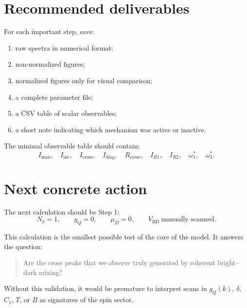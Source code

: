 \documentclass[11pt]{article}
\begin{document}
\section{Recommended deliverables}

For each important step, save:
\begin{enumerate}
    \item raw spectra in numerical format;
    \item non-normalized figures;
    \item normalized figures only for visual comparison;
    \item a complete parameter file;
    \item a CSV table of scalar observables;
    \item a short note indicating which mechanism was active or inactive.
\end{enumerate}

The minimal observable table should contain:
\begin{equation}
I_{\max},\quad
I_{\mathrm{int}},\quad
I_{\mathrm{cross}},\quad
I_{\mathrm{diag}},\quad
R_{\mathrm{cross}},\quad
I_{R1},\quad
I_{R2},\quad
\omega_1^\ast,\quad
\omega_3^\ast.
\end{equation}

\section{Next concrete action}

The next calculation should be Step 1:
\begin{equation}
N_k=1,\qquad
g_Q=0,\qquad
\mu_D=0,\qquad
V_{\mathrm{BD}}\ \text{manually scanned}.
\end{equation}

This calculation is the smallest possible test of the core of the model. It answers the question:
\begin{quote}
Are the cross peaks that we observe truly generated by coherent bright--dark mixing?
\end{quote}

Without this validation, it would be premature to interpret scans in \(g_Q(k)\), \(\delta\), \(C_1\), \(T\), or \(B\) as signatures of the spin sector.
\end{document}
